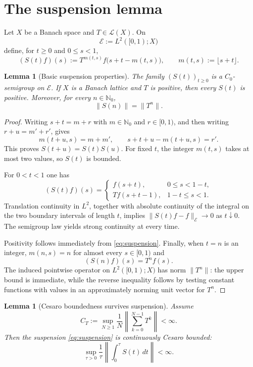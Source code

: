 \documentclass[11pt]{article}
\newtheorem{lemma}[theorem]{Lemma}
\newcommand{\N}{\mathbb N}
\newcommand{\E}{\mathcal E}
\begin{document}
\section{The suspension lemma}

Let $X$ be a Banach space and $T\in\mathcal L(X)$.  On
\[
  \E:=L^2([0,1);X)
\]
define, for $t\geq0$ and $0\leq s<1$,
\begin{equation}\label{eq:suspension}
  (S(t)f)(s):=T^{m(t,s)}f\bigl(s+t-m(t,s)\bigr),
  \qquad m(t,s):=\lfloor s+t\rfloor.
\end{equation}

\begin{lemma}[Basic suspension properties]\label{lem:basic}
The family $(S(t))_{t\geq0}$ is a $C_0$-semigroup on $\E$.  If $X$ is a
Banach lattice and $T$ is positive, then every $S(t)$ is positive.  Moreover,
for every $n\in\N_0$,
\begin{equation}\label{eq:integer}
  \|S(n)\|=\|T^n\|.
\end{equation}
\end{lemma}

\begin{proof}
Writing $s+t=m+r$ with $m\in\N_0$ and $r\in[0,1)$, and then writing
$r+u=m'+r'$, gives
\[
  m(t+u,s)=m+m',\qquad
  s+t+u-m(t+u,s)=r'.
\]
This proves $S(t+u)=S(t)S(u)$.  For fixed $t$, the integer $m(t,s)$ takes at
most two values, so $S(t)$ is bounded.

For $0<t<1$ one has
\[
 (S(t)f)(s)=
 \begin{cases}
   f(s+t),&0\leq s<1-t,\\
   Tf(s+t-1),&1-t\leq s<1.
 \end{cases}
\]
Translation continuity in $L^2$, together with absolute continuity of the
integral on the two boundary intervals of length $t$, implies
$\|S(t)f-f\|_{\E}\to0$ as $t\downarrow0$.  The semigroup law yields strong
continuity at every time.

Positivity follows immediately from \eqref{eq:suspension}.  Finally, when
$t=n$ is an integer, $m(n,s)=n$ for almost every $s\in[0,1)$ and
\[
  (S(n)f)(s)=T^nf(s).
\]
The induced pointwise operator on $L^2([0,1);X)$ has norm $\|T^n\|$: the upper
bound is immediate, while the reverse inequality follows by testing constant
functions with values in an approximately norming unit vector for $T^n$.
\end{proof}

\begin{lemma}[Cesaro boundedness survives suspension]\label{lem:cesaro}
Assume
\begin{equation}\label{eq:disc-cesaro}
  C_T:=\sup_{N\geq1}\frac1N
  \left\|\sum_{k=0}^{N-1}T^k\right\|<\infty.
\end{equation}
Then the suspension \eqref{eq:suspension} is continuously Cesaro bounded:
\[
  \sup_{\tau>0}\frac1\tau
  \left\|\int_0^\tau S(t)\,dt\right\|<\infty.
\]
\end{lemma}
\end{document}
